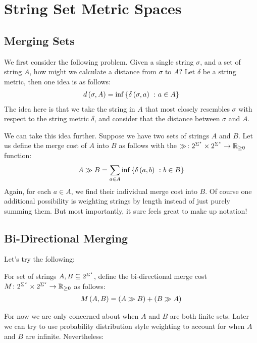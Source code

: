 \documentclass[12pt]{article}
\begin{document}
\section{String Set Metric Spaces}

\subsection{Merging Sets}
We first consider the following problem.
Given a single string \(\sigma\), and a set of string \(A\),
how might we calculate a distance from \(\sigma\) to \(A\)?
Let \(\delta\) be a string metric, then one idea is as follows:
\begin{align*}
  d\left(\sigma, A\right) = \inf \left\{\delta \left(\sigma, a\right) \ \colon a \in A\right\}
\end{align*}
The idea here is that we take the string in \(A\) that most closely
resembles \(\sigma\) with respect to the string metric \(\delta\),
and consider that the distance between \(\sigma\) and \(A\).

We can take this idea further.
Suppose we have two sets of strings \(A\) and \(B\).
Let us define the merge cost of \(A\) into \(B\) as follows
with the
\(\gg \colon 2^{\Sigma^\star} \times 2^{\Sigma^\star} \to \mathbb{R}_{\geq 0}\)
function:
\begin{align*}
  A \gg B = \sum_{a \in A} \inf \left\{\delta\left(a, b\right) \ \colon b \in B\right\}
\end{align*}
Again, for each \(a \in A\), we find their individual merge cost into \(B\).
Of course one additional possibility is weighting strings by length
instead of just purely summing them.
But most importantly, it sure feels great to make up notation!

\subsection{Bi-Directional Merging}
Let's try the following:
\begin{definition}
  For set of strings \(A, B \subseteq 2^{\Sigma^\star}\),
  define the bi-directional merge cost
  \(M \colon 2^{\Sigma^\star} \times 2^{\Sigma^\star} \to \mathbb{R}_{\geq 0}\)
  as follows:
  \begin{align*}
    M\left(A, B\right) = \left(A \gg B\right) + \left(B \gg A\right)
  \end{align*}
\end{definition}
For now we are only concerned about when \(A\) and \(B\) are both finite sets.
Later we can try to use probability distribution style weighting
to account for when \(A\) and \(B\) are infinite.
Nevertheless:
\end{document}
